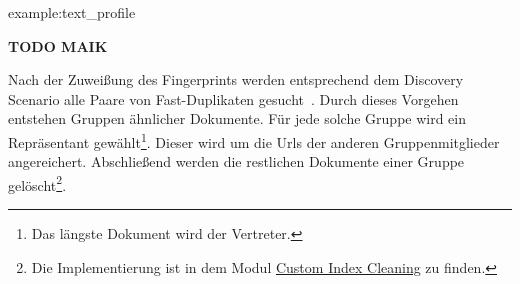 \begin{example}{example:text_profile}

	\textbf{TODO MAIK}

\end{example}

Nach der Zuweißung des Fingerprints werden entsprechend dem Discovery Scenario alle Paare von Fast-Duplikaten
gesucht~\cite{croft.chap3}. Durch dieses Vorgehen entstehen Gruppen ähnlicher Dokumente.
Für jede solche Gruppe wird ein Repräsentant gewählt\footnote{Das längste Dokument wird der Vertreter.}.
Dieser wird um die Urls der anderen Gruppenmitglieder angereichert.
Abschließend werden die restlichen Dokumente einer Gruppe gelöscht\footnote{Die Implementierung ist in dem Modul 
\href{https://github.com/mam10eks/search-homepage-of-university-leipzig/tree/master/custom-index-cleaning}
{Custom Index Cleaning} zu finden.}.
